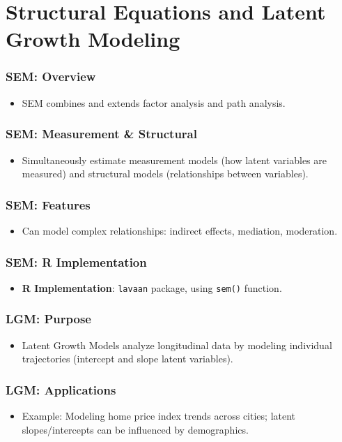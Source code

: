 \documentclass{beamer}
\newcommand{\code}[1]{\texttt{#1}}
\begin{document}
\section{Structural Equations and Latent Growth Modeling}
\begin{frame}
    \frametitle{SEM: Overview}
    \begin{itemize}
        \item SEM combines and extends factor analysis and path analysis.
    \end{itemize}
\end{frame}

\begin{frame}
    \frametitle{SEM: Measurement \& Structural}
    \begin{itemize}
        \item Simultaneously estimate measurement models (how latent variables are measured) and structural models (relationships between variables).
    \end{itemize}
\end{frame}

\begin{frame}
    \frametitle{SEM: Features}
    \begin{itemize}
        \item Can model complex relationships: indirect effects, mediation, moderation.
    \end{itemize}
\end{frame}

\begin{frame}
    \frametitle{SEM: R Implementation}
    \begin{itemize}
        \item \textbf{R Implementation}: \code{lavaan} package, using \code{sem()} function.
    \end{itemize}
\end{frame}

\begin{frame}
    \frametitle{LGM: Purpose}
    \begin{itemize}
        \item Latent Growth Models analyze longitudinal data by modeling individual trajectories (intercept and slope latent variables).
    \end{itemize}
\end{frame}

\begin{frame}
    \frametitle{LGM: Applications}
    \begin{itemize}
        \item Example: Modeling home price index trends across cities; latent slopes/intercepts can be influenced by demographics.
    \end{itemize}
\end{frame}
\end{document}
